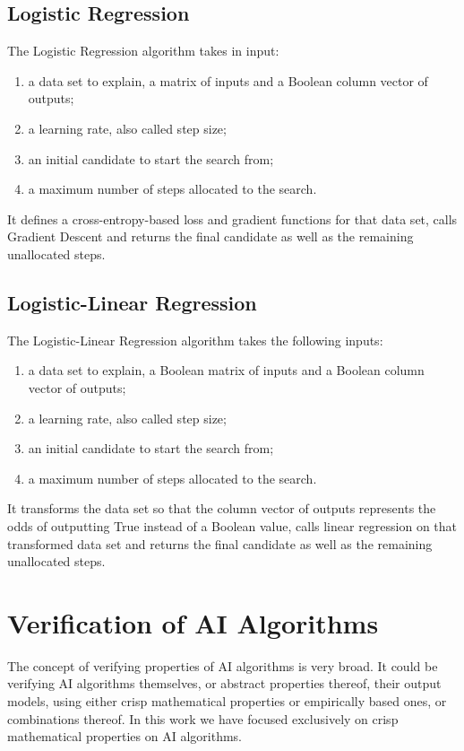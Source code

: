 \documentclass[]{report}
\begin{document}
\subsection{Logistic Regression}
The Logistic Regression algorithm takes in input:
\begin{enumerate}
\item a data set to explain, a matrix of inputs and a Boolean column
  vector of outputs;
\item a learning rate, also called step size;
\item an initial candidate to start the search from;
\item a maximum number of steps allocated to the search.
\end{enumerate}
It defines a cross-entropy-based loss and gradient functions for that
data set, calls Gradient Descent and returns the final candidate as
well as the remaining unallocated steps.

\subsection{Logistic-Linear Regression}
The Logistic-Linear Regression algorithm takes the following inputs:
\begin{enumerate}
\item a data set to explain, a Boolean matrix of inputs and a Boolean
  column vector of outputs;
\item a learning rate, also called step size;
\item an initial candidate to start the search from;
\item a maximum number of steps allocated to the search.
\end{enumerate}
It transforms the data set so that the column vector of outputs
represents the odds of outputting True instead of a Boolean value,
calls linear regression on that transformed data set and returns the
final candidate as well as the remaining unallocated steps.

\section{Verification of AI Algorithms}

The concept of verifying properties of AI algorithms is very broad.
It could be verifying AI algorithms themselves, or abstract properties
thereof, their output models, using either crisp mathematical
properties or empirically based ones, or combinations thereof.  In
this work we have focused exclusively on crisp mathematical properties
on AI algorithms.
\end{document}
